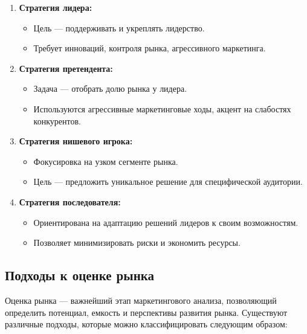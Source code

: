 \begin{enumerate}
    \item \textbf{Стратегия лидера:}
    \begin{itemize}
        \item Цель --- поддерживать и укреплять лидерство.
        \item Требует инноваций, контроля рынка, агрессивного маркетинга.
    \end{itemize}
    \item \textbf{Стратегия претендента:}
    \begin{itemize}
        \item Задача --- отобрать долю рынка у лидера.
        \item Используются агрессивные маркетинговые ходы, акцент на слабостях конкурентов.
    \end{itemize}
    \item \textbf{Стратегия нишевого игрока:}
    \begin{itemize}
        \item Фокусировка на узком сегменте рынка.
        \item Цель --- предложить уникальное решение для специфической аудитории.
    \end{itemize}
    \item \textbf{Стратегия последователя:}
    \begin{itemize}
        \item Ориентирована на адаптацию решений лидеров к своим возможностям.
        \item Позволяет минимизировать риски и экономить ресурсы.
    \end{itemize}
\end{enumerate}

\pagebreak

\subsection{Подходы к оценке рынка}

Оценка рынка --- важнейший этап маркетингового анализа, позволяющий определить потенциал, емкость и перспективы развития рынка. Существуют различные подходы, которые можно классифицировать следующим образом:

